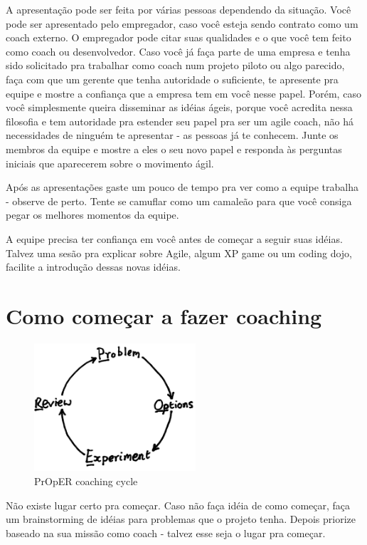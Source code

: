 \documentclass[a4paper, 10pt, font=plain]{abnt}
\begin{document}
A apresentação pode ser feita por várias pessoas dependendo da situação. Você pode ser apresentado pelo empregador, caso você esteja sendo contrato como um coach externo. O empregador pode citar suas qualidades e o que você tem feito como coach ou desenvolvedor.
Caso você já faça parte de uma empresa e tenha sido solicitado pra trabalhar como coach num projeto piloto ou algo parecido, faça com que um gerente que tenha autoridade o suficiente, te apresente pra equipe e mostre a confiança que a empresa tem em você nesse papel. Porém, caso você simplesmente queira disseminar as idéias ágeis, porque você acredita nessa filosofia e tem autoridade pra estender seu papel pra ser um agile coach, não há necessidades de ninguém te apresentar - as pessoas já te conhecem. Junte os membros da equipe e mostre a eles o seu novo papel e responda às perguntas iniciais que aparecerem sobre o movimento ágil.

Após as apresentações gaste um pouco de tempo pra ver como a equipe trabalha - observe de perto. Tente se camuflar como um camaleão para que você consiga pegar os melhores momentos da equipe.

A equipe precisa ter confiança em você antes de começar a seguir suas idéias. Talvez uma sesão pra explicar sobre Agile, algum XP game ou um coding dojo, facilite a introdução dessas novas idéias.



\section{Como começar a fazer coaching}
    \begin{figure}[h]
        \centering
        \includegraphics[width=6cm]{PrOpER.png}
        \caption{PrOpER coaching cycle}
    \end{figure}

Não existe lugar certo pra começar. Caso não faça idéia de como começar, faça um brainstorming de idéias para problemas que o projeto tenha. Depois priorize baseado na sua missão como coach - talvez esse seja o lugar pra começar.
\end{document}
